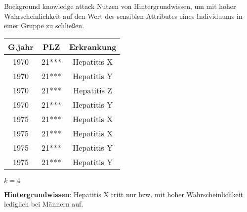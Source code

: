 \begin{frame} {Background knowledge attack}
	Nutzen von Hintergrundwissen, um mit hoher Wahrscheinlichkeit auf den Wert des sensiblen Attributes eines Individuums in einer Gruppe zu schließen.
	\vspace{0.5cm}

	\centering
	\small
	\begin{tabular}{|c|c|c|}
	\hline \textbf{G.jahr} & \textbf{PLZ} & \textbf{Erkrankung} \\
	\hline 1970 & 21*** & Hepatitis X \\ 
	 1970 & 21*** & Hepatitis Y \\ 
	 1970 & 21*** & Hepatitis Z \\ 
	 1970 & 21*** & Hepatitis Y \\ 
	\hline 1975 & 21*** & \cellcolor{svshellblau1}Hepatitis X \\ 
	 1975 & 21*** & \cellcolor{svshellblau1} Hepatitis X \\ 
	 1975 & 21*** & \cellcolor{svsrot}Hepatitis Y \\ 
	 1975 & 21*** & \cellcolor{svsrot}Hepatitis Y \\
	\hline 
	\end{tabular}
	\vspace{0.3cm}

	\(k = 4\)
	\vspace{0.3cm}

	\textbf{Hintergrundwissen}: Hepatitis X tritt nur bzw. mit hoher Wahrscheinlichkeit lediglich bei Männern auf.
\end{frame}
